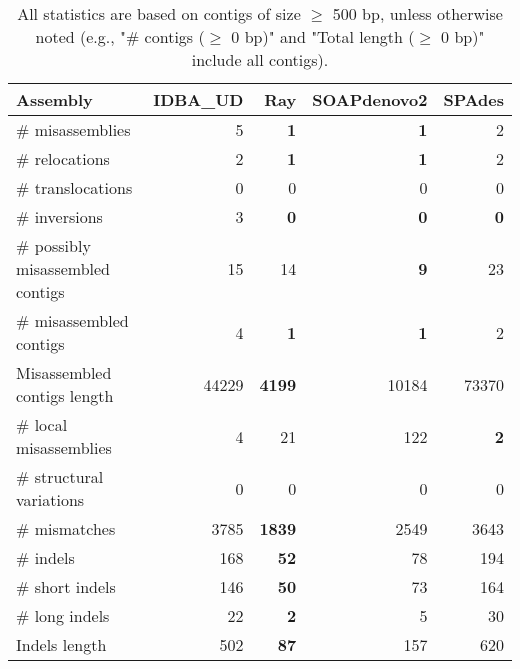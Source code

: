 \documentclass[12pt,a4paper]{article}
\begin{document}
\begin{table}[ht]
\begin{center}
\caption{All statistics are based on contigs of size $\geq$ 500 bp, unless otherwise noted (e.g., "\# contigs ($\geq$ 0 bp)" and "Total length ($\geq$ 0 bp)" include all contigs).}
\begin{tabular}{|l*{4}{|r}|}
\hline
Assembly & IDBA\_UD & Ray & SOAPdenovo2 & SPAdes \\ \hline
\# misassemblies & 5 & {\bf 1} & {\bf 1} & 2 \\ \hline
\hspace{5mm}\# relocations & 2 & {\bf 1} & {\bf 1} & 2 \\ \hline
\hspace{5mm}\# translocations & 0 & 0 & 0 & 0 \\ \hline
\hspace{5mm}\# inversions & 3 & {\bf 0} & {\bf 0} & {\bf 0} \\ \hline
\# possibly misassembled contigs & 15 & 14 & {\bf 9} & 23 \\ \hline
\# misassembled contigs & 4 & {\bf 1} & {\bf 1} & 2 \\ \hline
Misassembled contigs length & 44229 & {\bf 4199} & 10184 & 73370 \\ \hline
\# local misassemblies & 4 & 21 & 122 & {\bf 2} \\ \hline
\# structural variations & 0 & 0 & 0 & 0 \\ \hline
\# mismatches & 3785 & {\bf 1839} & 2549 & 3643 \\ \hline
\# indels & 168 & {\bf 52} & 78 & 194 \\ \hline
\hspace{5mm}\# short indels & 146 & {\bf 50} & 73 & 164 \\ \hline
\hspace{5mm}\# long indels & 22 & {\bf 2} & 5 & 30 \\ \hline
Indels length & 502 & {\bf 87} & 157 & 620 \\ \hline
\end{tabular}
\end{center}
\end{table}
\end{document}
